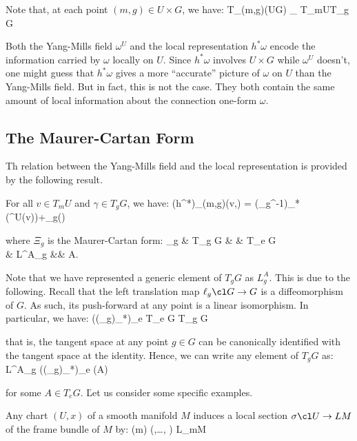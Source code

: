 Note that, at each point $(m,g)\in U\times G$, we have:
\bse
T_{(m,g)}(U\times G) \cong_{} T_mU\oplus T_g G
\ese

Both the Yang-Mills field $\omega^U$ and the local representation $h^*\omega$ encode the information carried by
$\omega$ locally on $U$. Since $h^*\omega$ involves $U\times G$ while $\omega^U$ doesn't, one might guess that
$h^*\omega$ gives a more ``accurate'' picture of $\omega$ on $U$ than the Yang-Mills field. But in fact, this is not
the case. They both contain the same amount of local information about the connection one-form $\omega$.

\subsection{The Maurer-Cartan Form}

Th relation between the Yang-Mills field and the local representation is provided by the following result.

\bt[]
For all $v\in T_m U$ and $\gamma \in T_g G$, we have:
\bse
(h^*\omega)_{(m,g)}(v,\gamma) = (\Ad_{g^{-1}})_*(\omega^U(v))+\Xi_g(\gamma)
\ese

where $\Xi_g$ is the Maurer-Cartan form:
\Xi_g \cl & T_g G & \xrightarrow{\sim} & T_e G\\ & L^A_g &\mapsto & A.
\ei
\et

\vspace{10pt}


Note that we have represented a generic element of $T_g G$ as $L^A_g$. This is due to the following. Recall that the
left translation map $\ell_g\cl G \to G$ is a diffeomorphism of $G$. As such, its push-forward at any point is a
linear isomorphism. In particular, we have:
\bse
((\ell_g)_*)_e \cl T_e G \xrightarrow{\sim} T_g G
\ese

that is, the tangent space at any point $g\in G$ can be canonically identified with the tangent space at the identity.
Hence, we can write any element of $T_g G$ as:
\bse
L^A_g \coloneqq ((\ell_g)_*)_e (A)
\ese

for some $A\in T_e G$. \v

Let us consider some specific examples.

\be
Any chart $(U,x)$ of a smooth manifold $M$ induces a local section $\sigma\cl U\to LM$ of the frame bundle of $M$ by:
\bse
\sigma(m) \coloneqq \biggl(,\ldots, \biggr) \in L_mM
\ese

